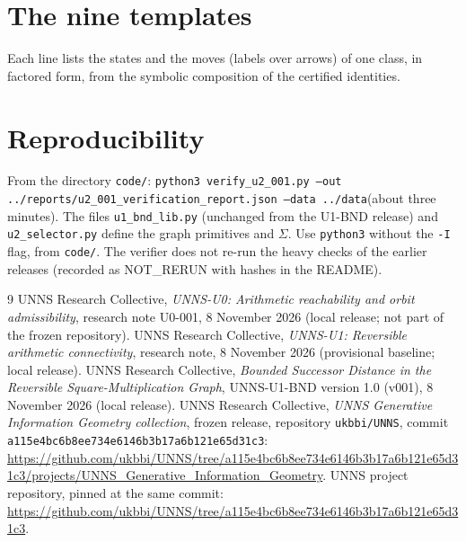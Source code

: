 \documentclass[11pt]{article}
\theoremstyle{definition}
\begin{document}
\appendix
\section{The nine templates}\label{app:templates}
Each line lists the states and the moves (labels over arrows) of one class, in factored form, from the symbolic composition of the certified identities.
{\small}

\section{Reproducibility}\label{app:repro}
From the directory \texttt{code/}: \texttt{python3 verify\_u2\_001.py --out ../reports/u2\_001\_verification\_report.json --data ../data}\linebreak (about three minutes). The files \texttt{u1\_bnd\_lib.py} (unchanged from the U1-BND release) and
\texttt{u2\_selector.py} define the graph primitives and $\Sigma$. Use \texttt{python3} without the \texttt{-I} flag, from \texttt{code/}. The verifier does not re-run the heavy checks of the earlier releases (recorded as NOT\_RERUN with hashes in the README).

\begin{thebibliography}{9}
 UNNS Research Collective, \emph{UNNS-U0: Arithmetic reachability and orbit admissibility}, research note U0-001, 8 November 2026 (local release; not part of the frozen repository).
 UNNS Research Collective, \emph{UNNS-U1: Reversible arithmetic connectivity}, research note, 8 November 2026 (provisional baseline; local release).
 UNNS Research Collective, \emph{Bounded Successor Distance in the Reversible Square-Multiplication Graph}, UNNS-U1-BND version 1.0 (v001), 8 November 2026 (local release).
 UNNS Research Collective, \emph{UNNS Generative Information Geometry collection}, frozen release, repository \texttt{ukbbi/UNNS}, commit \texttt{a115e4bc6b8ee734e6146b3b17a6b121e65d31c3}:
\url{https://github.com/ukbbi/UNNS/tree/a115e4bc6b8ee734e6146b3b17a6b121e65d31c3/projects/UNNS_Generative_Information_Geometry}.
 UNNS project repository, pinned at the same commit:
\url{https://github.com/ukbbi/UNNS/tree/a115e4bc6b8ee734e6146b3b17a6b121e65d31c3}.
\end{thebibliography}
\end{document}
